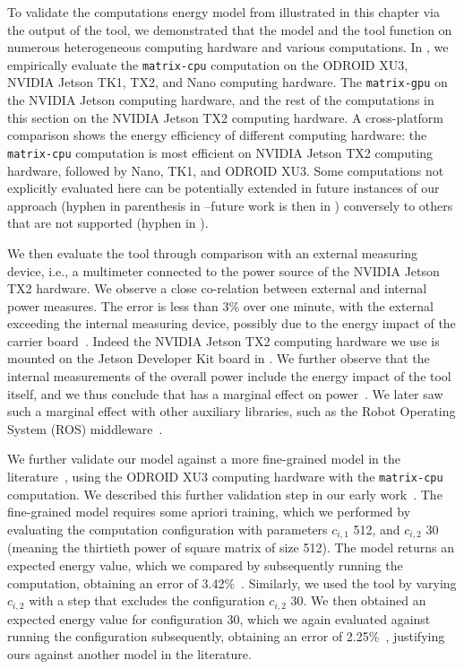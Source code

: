 To validate the computations energy model from  illustrated in this chapter via the output of the \powprof{} tool, we demonstrated that the model and the tool function on numerous heterogeneous computing hardware and various computations. In , we empirically evaluate the {\small\tt matrix-cpu} computation on the ODROID XU3, NVIDIA Jetson TK1, TX2, and Nano computing hardware. The {\small\tt matrix-gpu} on the NVIDIA Jetson computing hardware, and the rest of the computations in this section on the NVIDIA Jetson TX2 computing hardware. A cross-platform comparison shows the energy efficiency of different computing hardware: the {\small\tt matrix-cpu} computation is most efficient on NVIDIA Jetson TX2 computing hardware, followed by Nano, TK1, and ODROID XU3. Some computations not explicitly evaluated here can be potentially extended in future instances of our approach (hyphen in parenthesis in --future work is then in ) conversely to others that are not supported (hyphen in ). 

We then evaluate the \powprof{} tool through comparison with an external measuring device, i.e., a multimeter connected to the power source of the NVIDIA Jetson TX2 hardware. We observe a close co-relation between external and internal power measures. The error is less than 3\% over one minute, with the external exceeding the internal measuring device, possibly due to the energy impact of the carrier board~\citep{seewald2019coarse}. Indeed the NVIDIA Jetson TX2 computing hardware we use is mounted on the Jetson Developer Kit board in . We further observe that the internal measurements of the overall power include the energy impact of the tool itself, and we thus conclude that \powprof{} has a marginal effect on power~\citep{seewald2019coarse}. We later saw such a marginal effect with other auxiliary libraries, such as the Robot Operating System (ROS) middleware~\citep{zamanakos2020energy}.

We further validate our model against a more fine-grained model in the literature~\cite{nunez2013enabling,nikov2015evaluation}, using the ODROID XU3 computing hardware with the {\small\tt matrix-cpu} computation. We described this further validation step in our early work~\citep{seewald2019coarse}. The fine-grained model requires some apriori training, which we performed by evaluating the computation configuration with parameters $c_{i,1}$ 512, and $c_{i,2}$ 30 (meaning the thirtieth power of square matrix of size 512). The model returns an expected energy value, which we compared by subsequently running the computation, obtaining an error of 3.42\%~\citep{seewald2019coarse}. Similarly, we used the \powprof{} tool by varying $c_{i,2}$ with a step that excludes the configuration $c_{i,2}$ 30. We then obtained an expected energy value for configuration 30, which we again evaluated against running the configuration subsequently, obtaining an error of 2.25\%~\citep{seewald2019coarse}, justifying ours against another model in the literature. 


